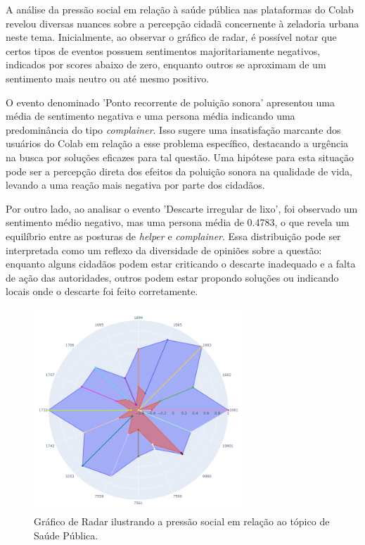 A análise da pressão social em relação à saúde pública nas plataformas do Colab revelou diversas nuances sobre a percepção cidadã concernente à zeladoria urbana neste tema. Inicialmente, ao observar o gráfico de radar, é possível notar que certos tipos de eventos possuem sentimentos majoritariamente negativos, indicados por scores abaixo de zero, enquanto outros se aproximam de um sentimento mais neutro ou até mesmo positivo.

O evento denominado 'Ponto recorrente de poluição sonora' apresentou uma média de sentimento negativa e uma persona média indicando uma predominância do tipo \textit{complainer}. Isso sugere uma insatisfação marcante dos usuários do Colab em relação a esse problema específico, destacando a urgência na busca por soluções eficazes para tal questão. Uma hipótese para esta situação pode ser a percepção direta dos efeitos da poluição sonora na qualidade de vida, levando a uma reação mais negativa por parte dos cidadãos.

Por outro lado, ao analisar o evento 'Descarte irregular de lixo', foi observado um sentimento médio negativo, mas uma persona média de 0.4783, o que revela um equilíbrio entre as posturas de \textit{helper} e \textit{complainer}. Essa distribuição pode ser interpretada como um reflexo da diversidade de opiniões sobre a questão: enquanto alguns cidadãos podem estar criticando o descarte inadequado e a falta de ação das autoridades, outros podem estar propondo soluções ou indicando locais onde o descarte foi feito corretamente.

\begin{figure}[htb]
	\centering
	\includegraphics[width=0.7\textwidth]{images/social_barometer_public_health.png}
	\caption{Gráfico de Radar ilustrando a pressão social em relação ao tópico de Saúde Pública.}
	\label{fig:social_barometer_public_health}
\end{figure}

